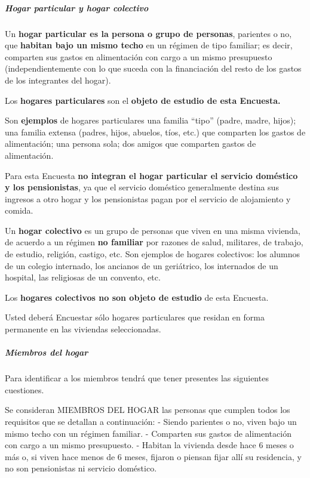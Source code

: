 \documentclass[
  openany]{book}
\begin{document}
\hypertarget{hogar-particular-y-hogar-colectivo}{%
\subparagraph{Hogar particular y hogar colectivo}\label{hogar-particular-y-hogar-colectivo}}

Un \textbf{hogar particular es la persona o grupo de personas}, parientes o no, que \textbf{habitan bajo un mismo techo} en un régimen de tipo familiar; es decir, comparten sus gastos en alimentación con cargo a un mismo presupuesto (independientemente con lo que suceda con la financiación del resto de los gastos de los integrantes del hogar).

Los \textbf{hogares particulares} son el \textbf{objeto de estudio de esta Encuesta.}

Son \textbf{ejemplos} de hogares particulares una familia ``tipo'' (padre, madre, hijos); una familia extensa (padres, hijos, abuelos, tíos, etc.) que comparten los gastos de alimentación; una persona sola; dos amigos que comparten gastos de alimentación.

Para esta Encuesta \textbf{no integran el hogar particular el servicio doméstico y los pensionistas}, ya que el servicio doméstico generalmente destina sus ingresos a otro hogar y los pensionistas pagan por el servicio de alojamiento y comida.

Un \textbf{hogar colectivo} es un grupo de personas que viven en una misma vivienda, de acuerdo a un régimen \textbf{no familiar} por razones de salud, militares, de trabajo, de estudio, religión, castigo, etc. Son ejemplos de hogares colectivos: los alumnos de un colegio internado, los ancianos de un geriátrico, los internados de un hospital, las religiosas de un convento, etc.

Los \textbf{hogares colectivos no son objeto de estudio} de esta Encuesta.

Usted deberá Encuestar sólo hogares particulares que residan en forma permanente en las viviendas seleccionadas.

\hypertarget{miembros-del-hogar}{%
\subparagraph{Miembros del hogar}\label{miembros-del-hogar}}

Para identificar a los miembros tendrá que tener presentes las siguientes cuestiones.

Se consideran MIEMBROS DEL HOGAR las personas que cumplen todos los requisitos que se detallan a continuación: - Siendo parientes o no, viven bajo un mismo techo con un régimen familiar. - Comparten sus gastos de alimentación con cargo a un mismo presupuesto. - Habitan la vivienda desde hace 6 meses o más o, si viven hace menos de 6 meses, fijaron o piensan fijar allí su residencia, y no son pensionistas ni servicio doméstico.
\end{document}
